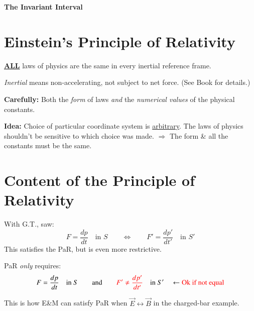 

\usepackage{tikz}
\usetikzlibrary{arrows.meta, decorations.pathmorphing}
\usepackage{amssymb}
\usepackage{nicefrac}



\thispagestyle{fancy}

\begin{center}
  {\huge \textbf{The Invariant Interval}}
\end{center}

\section*{Einstein's Principle of Relativity}

\textbf{\underline{ALL}} laws of physics are the same in every inertial reference frame.

\textit{Inertial} means non-accelerating, not subject to net force.
(See Book for details.)

\textbf{Carefully:} Both the \emph{form} of laws \emph{and} the \emph{numerical values}
of the physical constants.

\medskip
\textbf{Idea:} Choice of particular coordinate system is \underline{arbitrary}.
The laws of physics shouldn't be sensitive to which choice was made.
$\Rightarrow$ The form \& all the constants must be the same.

\section*{Content of the Principle of Relativity}

\begin{tcolorbox}
With G.T., saw:
\[
  F = \frac{dp}{dt} \quad \text{in } S
  \qquad\Longleftrightarrow\qquad
  F' = \frac{dp'}{dt'} \quad \text{in } S'
\]
This satisfies the PaR, but is even more restrictive.

PaR \emph{only} requires:
\[
  F = \frac{dp}{dt} \quad \text{in } S
  \qquad\text{and}\qquad
  \textcolor{red}{F' \neq \frac{dp'}{dt'}} \quad \text{in } S'
  \quad \leftarrow \textcolor{red}{\text{Ok if not equal}}
\]
\end{tcolorbox}

This is how E\&M can satisfy PaR when $\vec{E}\leftrightarrow\vec{B}$ in the charged-bar example.

